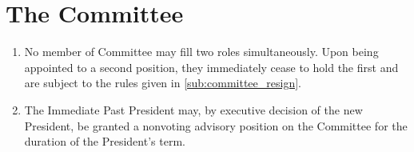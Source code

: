 \documentclass[a4paper]{article}
\newenvironment{enumsection}[1]{\section{#1} \begin{enumerate}[ref=\thesection.\theenumi]}{\end{enumerate}}
\begin{document}
\begin{enumsection}{The Committee}
\begin{enumerate}
\begin{enumerate}
            \item When reviewing, a simple majority vote of the General Meeting will confirm the appointment. If such a vote fails then the position must be immediately filled by election (as per \cref{sec:AGMs}).
        \end{enumerate}
        \item Remain vacant and be filled by election (as per \cref{sec:AGMs}) at the next General Meeting, which must be held within the next 2 weeks.
    \end{enumerate}
    \item No member of Committee may fill two roles simultaneously. Upon being appointed to a second position, they immediately cease to hold the first and are subject to the rules given in \cref{sub:committee_resign}.
    \item \label{sub:ipp_appointment} The Immediate Past President may, by executive decision of the new President, be granted a nonvoting advisory position on the Committee for the duration of the President's term.
\end{enumsection}
\end{document}
